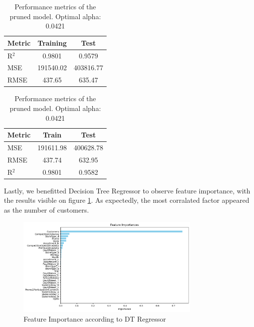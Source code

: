 \documentclass{article}
\begin{document}
\begin{table}[H] %
    \centering
    \begin{minipage}{0.48\textwidth} %
        \centering
        \begin{tabular}{|l|c|c|}
            \hline
            \textbf{Metric} & \textbf{Training} & \textbf{Test} \\
            \hline
            R\(^2\) & 0.9801 & 0.9579 \\
            \hline
            MSE & 191540.02 & 403816.77 \\
            \hline
            RMSE & 437.65 & 635.47 \\
            \hline
        \end{tabular}
        \caption{Performance metrics for the Decision Tree Regressor with the best parameters found.}
        \label{tab:performance_metrics}
    \end{minipage}\hfill
    \begin{minipage}{0.48\textwidth} %
        \centering
        \begin{tabular}{|l|c|c|}
            \hline
            \textbf{Metric} & \textbf{Train} & \textbf{Test} \\
            \hline
            MSE & 191611.98 & 400628.78 \\
            \hline
            RMSE & 437.74 & 632.95 \\
            \hline
            R\(^2\) & 0.9801 & 0.9582 \\
            \hline
        \end{tabular}
        \caption{Performance metrics of the pruned model. Optimal alpha: 0.0421}
        \label{tab:pruned_model_metrics}
    \end{minipage}
\end{table}

Lastly, we benefitted Decision Tree Regressor to observe feature importance, with the results visible on figure \ref{fig:feature_image}. As expectedly, the most corralated factor appeared as the number of customers. 

\begin{figure}[H] %
    \centering
    \includegraphics[width=0.8\textwidth]{feature.png} %
    \caption{Feature Importance according to DT Regressor} %
    \label{fig:feature_image} %
\end{figure}
\end{document}
